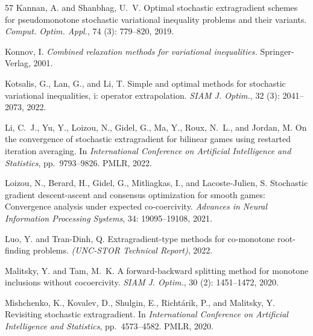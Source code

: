 \documentclass{article}
\theoremstyle{plain}
\theoremstyle{definition}
\theoremstyle{remark}
\begin{document}
\begin{thebibliography}{57}
Kannan, A. and Shanbhag, U.~V.
\newblock Optimal stochastic extragradient schemes for pseudomonotone
  stochastic variational inequality problems and their variants.
\newblock \emph{Comput. Optim. Appl.}, 74 (3): 779--820,
  2019.

Konnov, I.
\newblock \emph{Combined relaxation methods for variational inequalities.}
\newblock Springer-Verlag, 2001.

Kotsalis, G., Lan, G., and Li, T.
\newblock Simple and optimal methods for stochastic variational inequalities,
  i: operator extrapolation.
\newblock \emph{SIAM J. Optim.}, 32 (3): 2041--2073, 2022.

Li, C.~J., Yu, Y., Loizou, N., Gidel, G., Ma, Y., Roux, N.~L., and Jordan, M.
\newblock On the convergence of stochastic extragradient for bilinear games
  using restarted iteration averaging.
\newblock In \emph{International Conference on Artificial Intelligence and
  Statistics}, pp.\  9793--9826. PMLR, 2022.

Loizou, N., Berard, H., Gidel, G., Mitliagkas, I., and Lacoste-Julien, S.
\newblock Stochastic gradient descent-ascent and consensus optimization for
  smooth games: {C}onvergence analysis under expected co-coercivity.
\newblock \emph{Advances in Neural Information Processing Systems},
  34: 19095--19108, 2021.

Luo, Y. and Tran-Dinh, Q.
\newblock Extragradient-type methods for co-monotone root-finding problems.
\newblock \emph{(UNC-STOR Technical Report)}, 2022.

Malitsky, Y. and Tam, M.~K.
\newblock A forward-backward splitting method for monotone inclusions without
  cocoercivity.
\newblock \emph{SIAM J. Optim.}, 30 (2): 1451--1472, 2020.

Mishchenko, K., Kovalev, D., Shulgin, E., Richt{\'a}rik, P., and Malitsky, Y.
\newblock Revisiting stochastic extragradient.
\newblock In \emph{International Conference on Artificial Intelligence and
  Statistics}, pp.\  4573--4582. PMLR, 2020.


\end{thebibliography}
\end{document}
